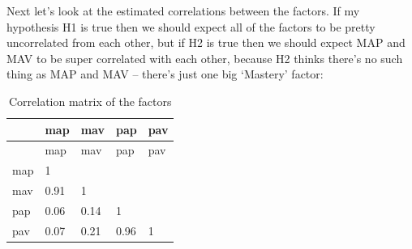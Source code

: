\documentclass[
  letterpaper,
  DIV=11,
  numbers=noendperiod]{scrreprt}
\newenvironment{Shaded}{\begin{snugshade}}{\end{snugshade}}
\newcommand{\AttributeTok}[1]{\textcolor[rgb]{0.40,0.45,0.13}{#1}}
\newcommand{\CommentTok}[1]{\textcolor[rgb]{0.37,0.37,0.37}{#1}}
\newcommand{\DecValTok}[1]{\textcolor[rgb]{0.68,0.00,0.00}{#1}}
\newcommand{\DocumentationTok}[1]{\textcolor[rgb]{0.37,0.37,0.37}{\textit{#1}}}
\newcommand{\FunctionTok}[1]{\textcolor[rgb]{0.28,0.35,0.67}{#1}}
\newcommand{\NormalTok}[1]{\textcolor[rgb]{0.00,0.23,0.31}{#1}}
\newcommand{\SpecialCharTok}[1]{\textcolor[rgb]{0.37,0.37,0.37}{#1}}
\newcommand{\StringTok}[1]{\textcolor[rgb]{0.13,0.47,0.30}{#1}}
\begin{document}
Next let's look at the estimated correlations between the factors. If my
hypothesis H1 is true then we should expect all of the factors to be
pretty uncorrelated from each other, but if H2 is true then we should
expect MAP and MAV to be super correlated with each other, because H2
thinks there's no such thing as MAP and MAV -- there's just one big
`Mastery' factor:

\begin{Shaded}
\end{Shaded}

\begin{longtable}[]{@{}lllll@{}}
\caption{Correlation matrix of the factors}\tabularnewline
\toprule()
& map & mav & pap & pav \\
\midrule()
\endfirsthead
\toprule()
& map & mav & pap & pav \\
\midrule()
\endhead
map & 1 & & & \\
mav & 0.91 & 1 & & \\
pap & 0.06 & 0.14 & 1 & \\
pav & 0.07 & 0.21 & 0.96 & 1 \\
\bottomrule()
\end{longtable}
\end{document}
